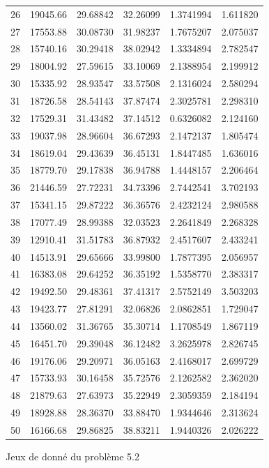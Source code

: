 \documentclass[a4paper]{article}
\begin{document}
\begin{appendices}
\begin{figure}[H]
\begin{tabular}{llllll}
26 &19045.66 &29.68842 &32.26099 &1.3741994 &1.611820\\
27 &17553.88 &30.08730 &31.98237 &1.7675207 &2.075037\\
28 &15740.16 &30.29418 &38.02942 &1.3334894 &2.782547\\
29 &18004.92 &27.59615 &33.10069 &2.1388954 &2.199912\\
30 &15335.92 &28.93547 &33.57508 &2.1316024 &2.580294\\
31 &18726.58 &28.54143 &37.87474 &2.3025781 &2.298310\\
32 &17529.31 &31.43482 &37.14512 &0.6326082 &2.124160\\
33 &19037.98 &28.96604 &36.67293 &2.1472137 &1.805474\\
34 &18619.04 &29.43639 &36.45131 &1.8447485 &1.636016\\
35 &18779.70 &29.17838 &36.94788 &1.4448157 &2.206464\\
36 &21446.59 &27.72231 &34.73396 &2.7442541 &3.702193\\
37 &15341.15 &29.87222 &36.36576 &2.4232124 &2.980588\\
38 &17077.49 &28.99388 &32.03523 &2.2641849 &2.268328\\
39 &12910.41 &31.51783 &36.87932 &2.4517607 &2.433241\\
40 &14513.91 &29.65666 &33.99800 &1.7877395 &2.056957\\
41 &16383.08 &29.64252 &36.35192 &1.5358770 &2.383317\\
42 &19492.50 &29.48361 &37.41317 &2.5752149 &3.503203\\
43 &19423.77 &27.81291 &32.06826 &2.0862851 &1.729047\\
44 &13560.02 &31.36765 &35.30714 &1.1708549 &1.867119\\
45 &16451.70 &29.39048 &36.12482 &3.2625978 &2.826745\\
46 &19176.06 &29.20971 &36.05163 &2.4168017 &2.699729\\
47 &15733.93 &30.16458 &35.72576 &2.1262582 &2.362020\\
48 &21879.63 &27.63973 &35.22949 &2.3059359 &2.184194\\
49 &18928.88 &28.36370 &33.88470 &1.9344646 &2.313624\\
50 &16166.68 &29.86825 &38.83211 &1.9440326 &2.026222\\



\hline
\end{tabular}
\caption{Jeux de donné du problème 5.2  }
\end{figure}














\end{appendices}
\end{document}
